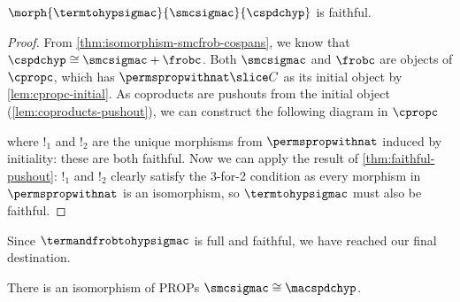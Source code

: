 \begin{proposition}
    \(\morph{\termtohypsigmac}{\smcsigmac}{\cspdchyp}\) is faithful.
\end{proposition}
\begin{proof}
    From \cref{thm:isomorphism-smcfrob-cospans}, we know that
    \(\cspdchyp \cong \smcsigmac + \frobc\).
    Both \(\smcsigmac\) and \(\frobc\) are objects of \(\cpropc\), which has
    \(\permspropwithnat \slice C\) as its initial object by
    \cref{lem:cpropc-initial}.
    As coproducts are pushouts from the initial object
    (\cref{lem:coproducts-pushout}), we can construct the following diagram in
    \(\cpropc\)
    \begin{center}
        
    \end{center}
    where \(!_1\) and \(!_2\) are the unique morphisms from
    \(\permspropwithnat\) induced by initiality: these are both faithful.
    Now we can apply the result of \cref{thm:faithful-pushout}: \(!_1\) and
    \(!_2\) clearly satisfy the 3-for-2 condition as every morphism in
    \(\permspropwithnat\) is an isomorphism, so \(\termtohypsigmac\) must also
    be faithful.
\end{proof}

Since \(\termandfrobtohypsigmac\) is full and faithful, we have reached our
final destination.

\begin{corollary}
    There is an isomorphism of PROPs \(\smcsigmac \cong \macspdchyp\).
\end{corollary}